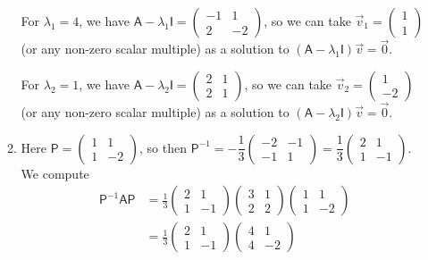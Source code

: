 \begin{enumerate}
\begin{enumerate}
For $\lambda_1 = 4$, we have $\mathsf{A} - \lambda_1\mathsf{I} = \begin{pmatrix} -1 & 1 \\ 2 & -2 \end{pmatrix}$, so we can take $\vec{v}_1 = \begin{pmatrix} 1 \\ 1 \end{pmatrix}$ (or any non-zero scalar multiple) as a solution to $(\mathsf{A} - \lambda_1\mathsf{I})\vec{v} = \vec{0}$.\par
For $\lambda_2 = 1$, we have $\mathsf{A} - \lambda_2\mathsf{I} = \begin{pmatrix} 2 & 1 \\ 2 & 1 \end{pmatrix}$, so we can take $\vec{v}_2 = \begin{pmatrix} 1 \\ -2 \end{pmatrix}$ (or any non-zero scalar multiple) as a solution to $(\mathsf{A} - \lambda_2\mathsf{I})\vec{v} = \vec{0}$.
\item Here $\mathsf{P} = \begin{pmatrix} 1 & 1 \\ 1 & -2 \end{pmatrix}$, so then $\mathsf{P}^{-1} = -\dfrac{1}{3}\begin{pmatrix} -2 & -1 \\ -1 & 1 \end{pmatrix} = \dfrac{1}{3}\begin{pmatrix} 2 & 1 \\ 1 & -1 \end{pmatrix}$. We compute
\begin{align*}
\mathsf{P}^{-1}\mathsf{AP} &= \frac{1}{3}\begin{pmatrix} 2 & 1 \\ 1 & -1 \end{pmatrix}\begin{pmatrix} 3 & 1 \\ 2 & 2 \end{pmatrix}\begin{pmatrix} 1 & 1 \\ 1 & -2 \end{pmatrix} \\
&= \frac{1}{3}\begin{pmatrix} 2 & 1 \\ 1 & -1 \end{pmatrix}\begin{pmatrix} 4 & 1 \\ 4 & -2 \end{pmatrix} \\

\end{align*}
\end{enumerate}
\end{enumerate}
